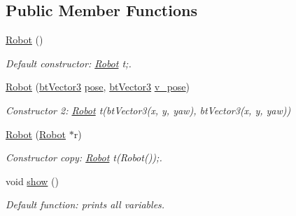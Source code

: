 \subsection*{Public Member Functions}
\begin{DoxyCompactItemize}
\item 
\hypertarget{structcommon_1_1Robot_a41ba088fd67d929808e381126f7b6c2e}{\hyperlink{structcommon_1_1Robot_a41ba088fd67d929808e381126f7b6c2e}{Robot} ()}\label{structcommon_1_1Robot_a41ba088fd67d929808e381126f7b6c2e}

\begin{DoxyCompactList}\small\item\em Default constructor\-: \hyperlink{structcommon_1_1Robot}{Robot} t;. \end{DoxyCompactList}\item 
\hypertarget{structcommon_1_1Robot_a32c611a544e879cf59d66bd87e3884d9}{\hyperlink{structcommon_1_1Robot_a32c611a544e879cf59d66bd87e3884d9}{Robot} (\hyperlink{structcommon_1_1btVector3}{bt\-Vector3} \hyperlink{structcommon_1_1Robot_a31960c8ccd21cde1ca66e263851b83ad}{pose}, \hyperlink{structcommon_1_1btVector3}{bt\-Vector3} \hyperlink{structcommon_1_1Robot_a8114313ba162326a4cb51ce4d5c992f2}{v\-\_\-pose})}\label{structcommon_1_1Robot_a32c611a544e879cf59d66bd87e3884d9}

\begin{DoxyCompactList}\small\item\em Constructor 2\-: \hyperlink{structcommon_1_1Robot}{Robot} t(bt\-Vector3(x, y, yaw), bt\-Vector3(x, y, yaw)) \end{DoxyCompactList}\item 
\hypertarget{structcommon_1_1Robot_a3df83e11a40060ea9d3553384dcdaaa3}{\hyperlink{structcommon_1_1Robot_a3df83e11a40060ea9d3553384dcdaaa3}{Robot} (\hyperlink{structcommon_1_1Robot}{Robot} $\ast$r)}\label{structcommon_1_1Robot_a3df83e11a40060ea9d3553384dcdaaa3}

\begin{DoxyCompactList}\small\item\em Constructor copy\-: \hyperlink{structcommon_1_1Robot}{Robot} t(\-Robot());. \end{DoxyCompactList}\item 
\hypertarget{structcommon_1_1Robot_a224e3f9997e44c5edf67fd0989aee5cf}{void \hyperlink{structcommon_1_1Robot_a224e3f9997e44c5edf67fd0989aee5cf}{show} ()}\label{structcommon_1_1Robot_a224e3f9997e44c5edf67fd0989aee5cf}

\begin{DoxyCompactList}\small\item\em Default function\-: prints all variables. \end{DoxyCompactList}\end{DoxyCompactItemize}
